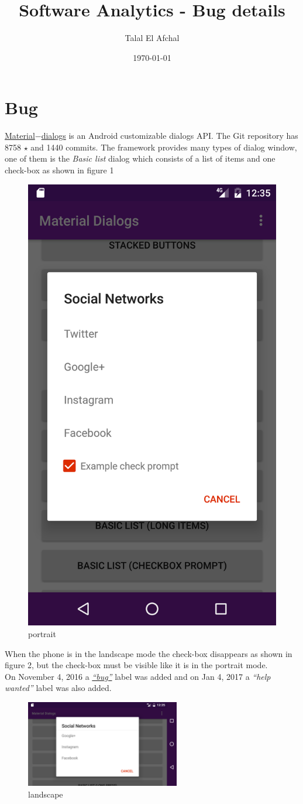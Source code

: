 \documentclass[12pt]{report}
\begin{document}
\title{Software Analytics - Bug details}
\author{Talal El Afchal}
\date{\today}
\maketitle
  \section*{Bug}
\href{https://github.com/afollestad/material-dialogs}{Material$-$dialogs} is an Android customizable dialogs API. The Git repository has 8758 $\star$ and 1440 commits.
The framework provides many types of dialog window, one of them is the \emph{Basic list} dialog which consists of a list of items and one check-box as shown in figure 1

\begin{figure}[H]
  \centering
  \includegraphics[height=0.4\textwidth]{screenshots/portrait.png}
  \caption{portrait}
\end{figure}
\noindent When the phone is in the landscape mode the check-box disappears as shown in figure 2, but the check-box must be visible like it is in the portrait mode.\\ On November 4, 2016 a \href{https://github.com/afollestad/material-dialogs/issues/1162}{\emph{``bug''}} label was added and on Jan 4, 2017 a \emph{``help wanted''} label was also added.\\


\begin{figure}[H]
  \centering
  \includegraphics[width=0.6\textwidth]{screenshots/landscape.png}
  \caption{landscape}
\end{figure}
\end{document}
